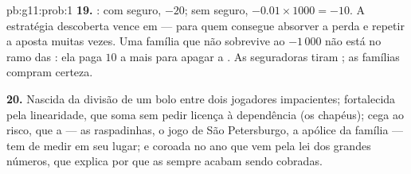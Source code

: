\begin{solution}{pb:g11:prob:1}
\textbf{19.} : com seguro, $-20$; sem seguro,
$-0.01 \times 1000 = -10$. A estratégia descoberta vence em
 --- para quem consegue absorver a perda e repetir a
aposta muitas vezes. Uma família que não sobrevive ao
$-1\,000$ não está no ramo das : ela paga $10$ a mais
para apagar a . As seguradoras tiram ; as
famílias compram certeza.

\textbf{20.} Nascida da divisão de um bolo entre dois jogadores
impacientes; fortalecida pela linearidade, que soma 
sem pedir licença à dependência (os chapéus); cega ao risco,
que a  --- as raspadinhas, o jogo de São Petersburgo, a
apólice da família --- tem de medir em seu lugar; e coroada no
ano que vem pela lei dos grandes números, que explica por que
as  sempre acabam sendo cobradas.
\end{solution}
